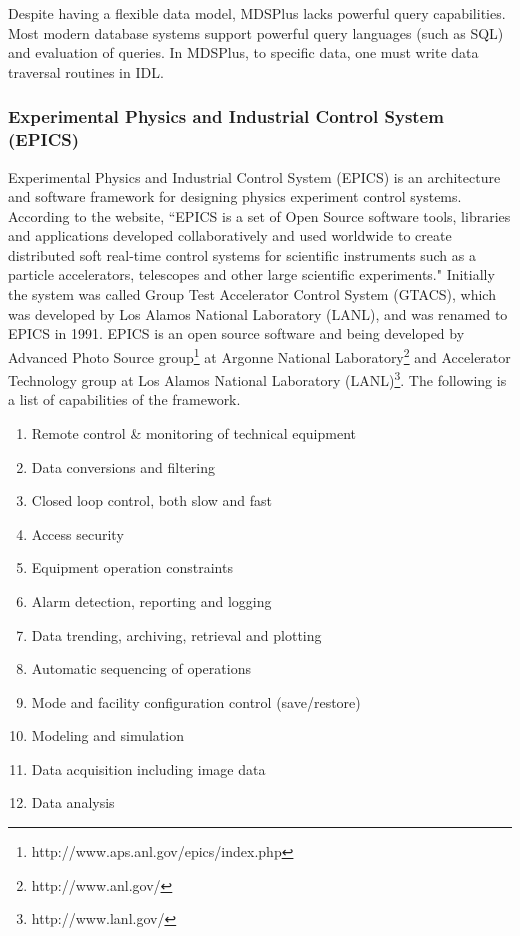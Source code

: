 Despite having a flexible data model, MDSPlus lacks powerful query capabilities. Most modern database systems support powerful query languages (such as SQL) and evaluation of queries. In MDSPlus, to specific data, one must write data traversal routines in IDL.

\subsubsection{Experimental Physics and Industrial Control System (EPICS)}\label{sec-epics}

Experimental Physics and Industrial Control System (EPICS)\cite{website:epics} is an architecture and software framework for designing physics experiment control systems. According to the website, ``EPICS is a set of Open Source software tools, libraries and applications developed collaboratively and used worldwide to create distributed soft real-time control systems for scientific instruments such as a particle accelerators, telescopes and other large scientific experiments." Initially the system was called Group Test Accelerator Control System (GTACS), which was developed by Los Alamos National Laboratory (LANL), and was renamed to EPICS in 1991. EPICS is an open source software and being developed by Advanced Photo Source group\footnote{http://www.aps.anl.gov/epics/index.php} at Argonne National Laboratory\footnote{http://www.anl.gov/} and Accelerator Technology group at Los Alamos National Laboratory (LANL)\footnote{http://www.lanl.gov/}\cite{lecture:johnson_intro_to_epics,dalesio1991epics}. The following is a list of capabilities of the framework\cite{lecture:johnson_intro_to_epics}.

\begin{enumerate}
\item Remote control \& monitoring of technical equipment
\item Data conversions and filtering
\item Closed loop control, both slow and fast
\item Access security
\item Equipment operation constraints
\item Alarm detection, reporting and logging
\item Data trending, archiving, retrieval and plotting
\item Automatic sequencing of operations
\item Mode and facility configuration control (save/restore)
\item Modeling and simulation
\item Data acquisition including image data
\item Data analysis
\end{enumerate}

